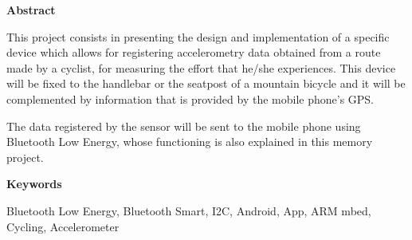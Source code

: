 
\newpage

\thispagestyle{empty}

\begin{center}

{\bf \Huge Abstract}

  \end{center}
\vspace{1cm}

This project consists in presenting the design and implementation of a specific device which allows for registering accelerometry data obtained from a route made by a cyclist, for measuring the effort that he/she experiences. This device will be fixed to the handlebar or the seatpost of a mountain bicycle and it will be complemented by information that is provided by the mobile phone's GPS.

The data registered by the sensor will be sent to the mobile phone using Bluetooth Low Energy, whose functioning is also explained in this memory project.

\vspace{1cm}


\begin{center}

{\bf \Large Keywords}

\end{center}

   \vspace{0.5cm}
   
Bluetooth Low Energy, Bluetooth Smart, I2C, Android, App, ARM mbed, Cycling, Accelerometer
   


